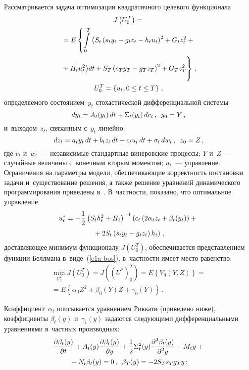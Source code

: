 \begin{multicols}{2}
     Рассматривается задача оптимизации квадратичного целевого 
функционала 
     \begin{multline}
     J\left( U_0^T\right)= {}\\
     {}= E\left\{ \int\limits^T_0 \big( S_t\left( s_ty_t-g_tz_t-
h_tu_t\right)^2 +G_t z_t^2+{}\right.\\
\left.{}+ H_tu_t^2\big)dt+
     S_T\left( s_T y_T-g_T z_T\right)^2+G_T z_T^2
     \vphantom{\int\limits^T_0}
     \right\}\,,\\ 
U_0^T=\left\{ u_t, 0\leq t\leq T
\right\}\,,
     \label{e1-bos}
     \end{multline}
     определяемого состоянием~$y_t$ 
стохастической дифференциальной системы
     \begin{equation}
     dy_t=A_t(y_t)\,dt+ \Sigma_t (y_t)\,dv_t\,,\enskip y_0=Y\,,
     \label{e2-bos}
     \end{equation}
     и~выходом~$z_t$, связанным с~$y_t$ линейно:
     \begin{equation*}
dz_t=a_ty_t\,dt +b_tz_t\,dt+c_tu_t\,dt+\sigma_t\,dw_t\,,\enskip z_0=Z\,,
\end{equation*}
где $v_t$ и~$w_t$~--- независимые стандартные винеровские процессы; $Y$ 
и~$Z$~--- случайные величины с~конечным вторым моментом; $u_t$~--- 
управление. Ограничения на параметры модели, обеспечивающие 
корректность постановки задачи и~существование решения, а также решение 
уравнений динамического программирования приведены в~\cite{1-bos}. 
В~частности, показано, что оптимальное управление
\begin{multline}
u_t^*=-\displaystyle\frac{\displaystyle 1\mathstrut}{\displaystyle 2\mathstrut}\left( S_th_t^2+H_t\right)^{-1} \left(c_t\left(2\alpha_t 
z_t+\beta_t(y_t)\right)+{}\right.\\
\left.{}+2S_t\left( s_t y_t -g_t z_t\right) h_t\right)\,,
\label{e4-bos}
\end{multline}
доставляющее минимум функционалу $J(U_0^T)$, обеспечивается 
представлением функции Беллмана в~виде~(\ref{e1a-bos}), 
в~част\-ности имеет место равенство:
\begin{multline}
\min\limits_{U_0^T} J\left( U_0^T\right) =J\left(\left( U^*\right)^T_0\right)=
E\left\{ V_0(Y,Z)\right\} ={}\\
{}=E\left\{ \alpha_0 
Z^2+\beta_0(Y)Z+\gamma_0(Y)\right\}\,.
\label{e5-bos}
\end{multline}
     
     Коэффициент~$\alpha_t$ описывается уравнением Риккати (приведено 
ниже), коэффициенты $\beta_t(y)$ и~$\gamma_t(y)$ задаются следующими 
дифференциальными уравнениями в~частных производных:
     \begin{multline*}
     \displaystyle\frac{\displaystyle \partial\beta_t(y)\mathstrut}{\displaystyle \partial t\mathstrut} +A_t(y) \displaystyle\frac{\displaystyle \partial\beta_t(y)\mathstrut}{\displaystyle \partial y\mathstrut} 
+\displaystyle\frac{\displaystyle 1\mathstrut}{\displaystyle 2\mathstrut} \Sigma_t^2(y) \displaystyle\frac{\displaystyle \partial^2\beta_t(y)\mathstrut}{\displaystyle \partial^2 y\mathstrut} +M_t y+{}\\
{}+N_t\beta_t (y) =0\,,\enskip 
     \beta_T(y)=-2S_T s_T g_T y\,;
     \end{multline*}
     

\end{multicols}
